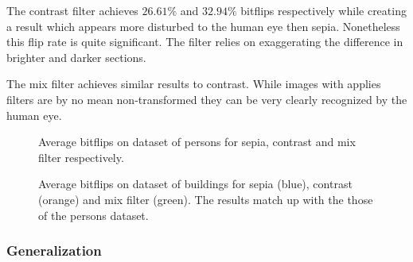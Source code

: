 \documentclass[10pt,twocolumn,letterpaper]{article}
\begin{document}
The contrast filter achieves $26.61\%$ and $32.94\%$ bitflips respectively while creating a result which appears more disturbed to the human eye then sepia. Nonetheless this flip rate is quite significant. The filter relies on exaggerating the difference in brighter and darker sections.  

The mix filter achieves similar results to contrast. While images with applies filters are by no mean non-transformed they can be very clearly recognized by the human eye.  

\begin{figure}[t]
  \centering
   \caption{Average bitflips on dataset of persons for sepia, contrast and mix filter respectively. }
   \label{fig:one}
\end{figure}

\begin{figure}[t]
  \centering
   \caption{Average bitflips on dataset of buildings for sepia (blue), contrast (orange) and mix filter (green). The results match up with the those of the persons dataset.}
   \label{fig:two}
\end{figure}

\subsubsection{Generalization}
\end{document}
